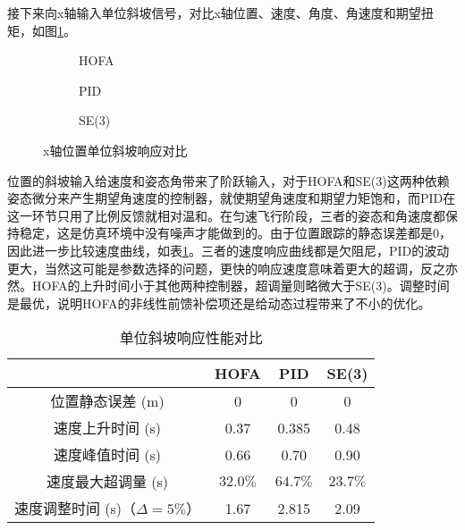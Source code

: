 接下来向x轴输入单位斜坡信号，对比x轴位置、速度、角度、角速度和期望扭矩，如图\ref{MATLAB_t}。
\begin{figure}[!htp]
  \centering
  \begin{subfigure}[t]{0.49\textwidth}
    \centering
    \caption{HOFA}
  \end{subfigure}\hfill
  \begin{subfigure}[t]{0.49\textwidth}
    \centering
    \caption{PID}
  \end{subfigure}\hfill
  \begin{subfigure}[t]{0.49\textwidth}
    \centering
    \caption{SE(3)}
  \end{subfigure}
  \caption{x轴位置单位斜坡响应对比}
  \label{MATLAB_t}
\end{figure}

位置的斜坡输入给速度和姿态角带来了阶跃输入，对于HOFA和SE(3)这两种依赖姿态微分来产生期望角速度的控制器，就使期望角速度和期望力矩饱和，而PID在这一环节只用了比例反馈就相对温和。在匀速飞行阶段，三者的姿态和角速度都保持稳定，这是仿真环境中没有噪声才能做到的。由于位置跟踪的静态误差都是0，因此进一步比较速度曲线，如表\ref{MATLAB斜坡对比}。三者的速度响应曲线都是欠阻尼，PID的波动更大，当然这可能是参数选择的问题，更快的响应速度意味着更大的超调，反之亦然。HOFA的上升时间小于其他两种控制器，超调量则略微大于SE(3)。调整时间是最优，说明HOFA的非线性前馈补偿项还是给动态过程带来了不小的优化。

\begin{table}[!h]
  \centering
  \caption{单位斜坡响应性能对比}
  \begin{tabular}{cccc}
      \toprule
      & HOFA & PID & SE(3) \\
      \midrule
    位置静态误差 (m)                 & 0    & 0 & 0 \\
    速度上升时间 (s)                 & 0.37 & 0.385 &0.48 \\
    速度峰值时间 (s)                 & 0.66 &0.70  & 0.90\\
    速度最大超调量 (s)                & $32.0\%$ & $64.7\%$  & $23.7\%$\\
    速度调整时间 (s)（$\Delta = 5\%$） & 1.67 &2.815 & 2.09\\
      \bottomrule
  \end{tabular}
  \label{MATLAB斜坡对比}
\end{table}
\newpage
